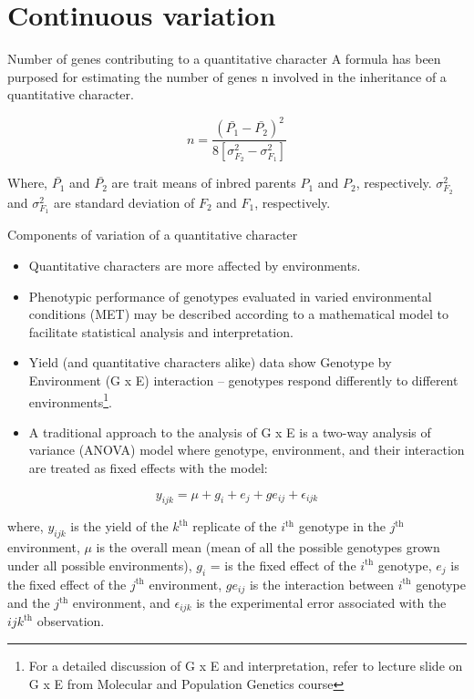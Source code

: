 \documentclass[11pt,ignorenonframetext,aspectratio=169]{beamer}
\providecommand{\tightlist}{%
  \setlength{\itemsep}{0pt}\setlength{\parskip}{0pt}}
\begin{document}
\hypertarget{continuous-variation}{%
\section{Continuous variation}\label{continuous-variation}}

\begin{frame}{Number of genes contributing to a quantitative character}
\protect\hypertarget{number-of-genes-contributing-to-a-quantitative-character}{}
A formula has been purposed for estimating the number of genes n
involved in the inheritance of a quantitative character.

\[n = \frac{(\bar{P_1} -\bar{P_2})^2}{8[\sigma_{F_2}^2-\sigma_{F_1}^2]}\]

Where, \(\bar{P_1}\) and \(\bar{P_2}\) are trait means of inbred parents
\(P_1\) and \(P_2\), respectively. \(\sigma_{F_2}^2\) and
\(\sigma_{F_1}^2\) are standard deviation of \(F_2\) and \(F_1\),
respectively.
\end{frame}

\begin{frame}{Components of variation of a quantitative character}
\protect\hypertarget{components-of-variation-of-a-quantitative-character}{}
\footnotesize

\begin{itemize}
\tightlist
\item
  Quantitative characters are more affected by environments.
\item
  Phenotypic performance of genotypes evaluated in varied environmental
  conditions (MET) may be described according to a mathematical model to
  facilitate statistical analysis and interpretation.
\item
  Yield (and quantitative characters alike) data show Genotype by
  Environment (G x E) interaction -- genotypes respond differently to
  different
  environments\footnote[frame]{For a detailed discussion of G x E and interpretation, refer to lecture slide on G x E from Molecular and Population Genetics course}.
\item
  A traditional approach to the analysis of G x E is a two-way analysis
  of variance (ANOVA) model where genotype, environment, and their
  interaction are treated as fixed effects with the model:
\end{itemize}

\[
y_{ijk} = \mu + g_{i} + e_{j} + ge_{ij} + \epsilon_{ijk}
\]

where, \(y_{ijk}\) is the yield of the \(k^{\text{th}}\) replicate of
the \(i^{\text{th}}\) genotype in the \(j^{\text{th}}\) environment,
\(\mu\) is the overall mean (mean of all the possible genotypes grown
under all possible environments), \(g_{i}\) = is the fixed effect of the
\(i^{\text{th}}\) genotype, \(e_{j}\) is the fixed effect of the
\(j^{\text{th}}\) environment, \(ge_{ij}\) is the interaction between
\(i^{\text{th}}\) genotype and the \(j^{\text{th}}\) environment, and
\(\epsilon_{ijk}\) is the experimental error associated with the
\(ijk^{\text{th}}\) observation.
\end{frame}
\end{document}
